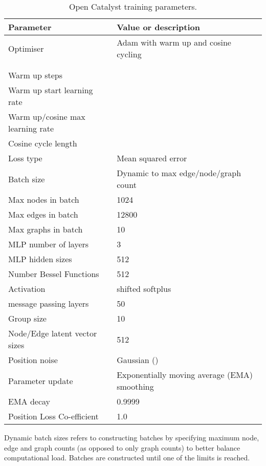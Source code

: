 \documentclass{article} \usepackage{iclr2022_conference,times}
\begin{document}
\begin{table}[]
\caption{Open Catalyst training parameters.}
    \label{oc_params}
    \centering
    \begin{tabular}{ll}
      \toprule
       Parameter & Value or description \\
       \midrule
       Optimiser & Adam with warm up and cosine cycling \\
          &  \\              
          &  \\                     
       Warm up steps    &  \\
       Warm up start learning rate    &  \\       
       Warm up/cosine max learning rate    &  \\       
       Cosine cycle length    &  \\       
       Loss type & Mean squared error \\
     \midrule
       Batch size & Dynamic to max edge/node/graph count \\
       Max nodes in batch & 1024 \\
       Max edges in batch & 12800 \\   
       Max graphs in batch & 10 \\    
     \midrule
       MLP number of layers & 3 \\
       MLP hidden sizes & 512 \\
       Number Bessel Functions & 512 \\
       Activation & shifted softplus \\
       message passing layers & 50 \\
       Group size & 10 \\
       Node/Edge latent vector sizes & 512 \\ 
     \midrule
       Position noise & Gaussian () \\
       Parameter update & Exponentially moving average (EMA) smoothing \\
       EMA decay & 0.9999 \\
       Position Loss Co-efficient & 1.0 \\
    \bottomrule

\end{tabular}

\end{table}

Dynamic batch sizes refers to constructing batches by specifying maximum node, edge and graph counts (as opposed to only graph counts) to better balance computational load. Batches are constructed until one of the limits is reached.
\end{document}
